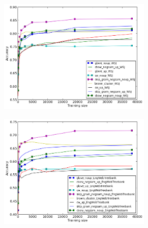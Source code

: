 \documentclass[11pt]{article}
\begin{document}
\begin{figure}
\caption{POS-Tagging out-of-vocabulary-words accuracy for \textit{in-domain} and \textit{out-of-domain} test sets}
\centering
\begin{subfigure}{.5\textwidth}
	\centering
    	\includegraphics[width=0.8\textwidth]{plots/POSoutOfVocIN.png}
	\label{fig:inpos}
\end{subfigure}
\begin{subfigure}{.5\textwidth}
	\centering
    	\includegraphics[width=0.8\textwidth]{plots/POSoutOfVocOUT.png}
	\label{fig:outpos}
\end{subfigure}  	
\end{figure} 

\end{document}

